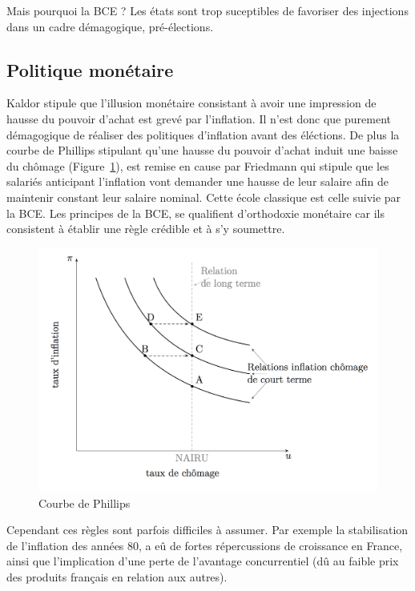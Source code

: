 Mais pourquoi la BCE ? Les états sont trop suceptibles de favoriser des injections dans un cadre démagogique, pré-élections. 

\subsection{Politique monétaire} %
\label{sub:politique_monetaire}

Kaldor stipule que l'illusion monétaire consistant à avoir une impression de hausse du pouvoir d'achat est grevé par l'inflation. Il n'est donc que purement 
démagogique de réaliser des politiques d'inflation avant des éléctions. De plus la courbe de Phillips stipulant qu'une hausse du pouvoir d'achat induit 
une baisse du chômage (Figure~\ref{fig:courbe_phillips}), est remise en cause par Friedmann qui stipule que les salariés anticipant l'inflation vont demander une hausse de
leur salaire afin de maintenir constant leur salaire nominal. Cette école classique est celle suivie par la BCE. Les principes de la BCE, se qualifient 
d'orthodoxie monétaire car ils consistent à établir une règle crédible et à s'y soumettre. 
\begin{figure}[h]
	\begin{center}
		\includegraphics[scale=0.5]{./img/im3}
		
	\end{center}
	\caption{Courbe de Phillips}
  \label{fig:courbe_phillips}
\end{figure}
\newpage

Cependant ces règles sont parfois difficiles à assumer. Par exemple la stabilisation de l'inflation des années 80, a eû de fortes répercussions de croissance  en France, ainsi que l'implication d'une perte de l'avantage concurrentiel (dû au faible prix des produits français en relation aux autres).

